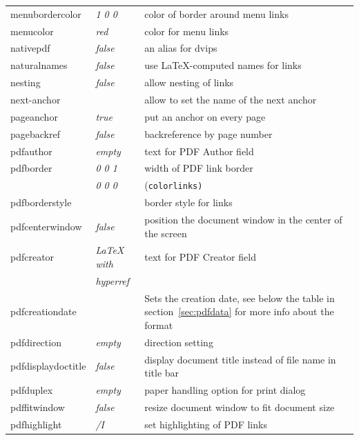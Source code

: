 \documentclass{article}
\begin{document}
\begin{longtable}{@{}>{\ttfamily}llp{7cm}@{}}
menubordercolor    & \textit{1 0 0}         & color of border around menu links \\
menucolor          & \textit{red}           & color for menu links \\
nativepdf          & \textit{false}         & an alias for \textsf{dvips} \\
naturalnames       & \textit{false}         & use \LaTeX-computed names for links \\
nesting            & \textit{false}         & allow nesting of links \\
next-anchor        &                        & allow to set the name of the next anchor\\
pageanchor         & \textit{true}          & put an anchor on every page \\
pagebackref        & \textit{false}         & backreference by page number \\
pdfauthor          & \textit{empty}         & text for PDF Author field \\
pdfborder          & \textit{0 0 1}         & width of PDF link border \\
                   & \textit{0 0 0}         & (\texttt{colorlinks)} \\
pdfborderstyle     &                        & border style for links \\
pdfcenterwindow    & \textit{false}         & position the document window in the center of the screen \\
pdfcreator         & \textit{LaTeX with}    & text for PDF Creator field \\
                   & \textit{hyperref}      & \\
pdfcreationdate    &                        & Sets the creation date, see below the table in section~\ref{sec:pdfdata} for more info about the format\\
pdfdirection       & \textit{empty}         & direction setting \\
pdfdisplaydoctitle & \textit{false}         & display document title instead
                                              of file name in title bar\\
pdfduplex          & \textit{empty}         & paper handling option for
                                              print dialog\\
pdffitwindow       & \textit{false}         & resize document window to fit document size \\
pdfhighlight       & \textit{/I}            & set highlighting of PDF links \\

\end{longtable}
\end{document}
